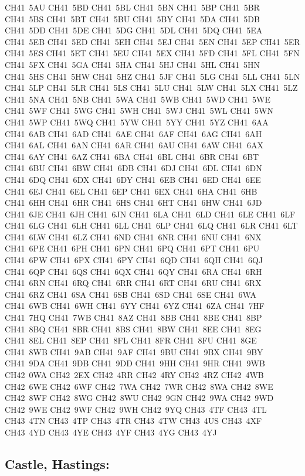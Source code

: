 \documentclass[12pt,a4paper]{article}
\begin{document}
{{CH41~5AU	CH41~5BD	CH41~5BL	CH41~5BN	CH41~5BP	CH41~5BR
CH41~5BS	CH41~5BT	CH41~5BU	CH41~5BY	CH41~5DA	CH41~5DB
CH41~5DD	CH41~5DE	CH41~5DG	CH41~5DL	CH41~5DQ	CH41~5EA
CH41~5EB	CH41~5ED	CH41~5EH	CH41~5EJ	CH41~5EN	CH41~5EP
CH41~5ER	CH41~5ES	CH41~5ET	CH41~5EU	CH41~5EX	CH41~5FD
CH41~5FL	CH41~5FN	CH41~5FX	CH41~5GA	CH41~5HA	CH41~5HJ
CH41~5HL	CH41~5HN	CH41~5HS	CH41~5HW	CH41~5HZ	CH41~5JF
CH41~5LG	CH41~5LL	CH41~5LN	CH41~5LP	CH41~5LR	CH41~5LS
CH41~5LU	CH41~5LW	CH41~5LX	CH41~5LZ	CH41~5NA	CH41~5NB
CH41~5WA	CH41~5WB	CH41~5WD	CH41~5WE	CH41~5WF	CH41~5WG
CH41~5WH	CH41~5WJ	CH41~5WL	CH41~5WN	CH41~5WP	CH41~5WQ
CH41~5YW	CH41~5YY	CH41~5YZ	CH41~6AA	CH41~6AB	CH41~6AD
CH41~6AE	CH41~6AF	CH41~6AG	CH41~6AH	CH41~6AL	CH41~6AN
CH41~6AR	CH41~6AU	CH41~6AW	CH41~6AX	CH41~6AY	CH41~6AZ
CH41~6BA	CH41~6BL	CH41~6BR	CH41~6BT	CH41~6BU	CH41~6BW
CH41~6DB	CH41~6DJ	CH41~6DL	CH41~6DN	CH41~6DQ	CH41~6DX
CH41~6DY	CH41~6EB	CH41~6ED	CH41~6EE	CH41~6EJ	CH41~6EL
CH41~6EP	CH41~6EX	CH41~6HA	CH41~6HB	CH41~6HH	CH41~6HR
CH41~6HS	CH41~6HT	CH41~6HW	CH41~6JD	CH41~6JE	CH41~6JH
CH41~6JN	CH41~6LA	CH41~6LD	CH41~6LE	CH41~6LF	CH41~6LG
CH41~6LH	CH41~6LL	CH41~6LP	CH41~6LQ	CH41~6LR	CH41~6LT
CH41~6LW	CH41~6LZ	CH41~6ND	CH41~6NR	CH41~6NU	CH41~6NX
CH41~6PE	CH41~6PH	CH41~6PN	CH41~6PQ	CH41~6PT	CH41~6PU
CH41~6PW	CH41~6PX	CH41~6PY	CH41~6QD	CH41~6QH	CH41~6QJ
CH41~6QP	CH41~6QS	CH41~6QX	CH41~6QY	CH41~6RA	CH41~6RH
CH41~6RN	CH41~6RQ	CH41~6RR	CH41~6RT	CH41~6RU	CH41~6RX
CH41~6RZ	CH41~6SA	CH41~6SB	CH41~6SD	CH41~6SE	CH41~6WA
CH41~6WB	CH41~6WH	CH41~6YY	CH41~6YZ	CH41~6ZA	CH41~7HF
CH41~7HQ	CH41~7WB	CH41~8AZ	CH41~8BB	CH41~8BE	CH41~8BP
CH41~8BQ	CH41~8BR	CH41~8BS	CH41~8BW	CH41~8EE	CH41~8EG
CH41~8EL	CH41~8EP	CH41~8FL	CH41~8FR	CH41~8FU	CH41~8GE
CH41~8WB	CH41~9AB	CH41~9AF	CH41~9BU	CH41~9BX	CH41~9BY
CH41~9DA	CH41~9DB	CH41~9DD	CH41~9HH	CH41~9HR	CH41~9WB
CH42~0WA	CH42~2EX	CH42~4RR	CH42~4RY	CH42~4RZ	CH42~4WB
CH42~6WE	CH42~6WF	CH42~7WA	CH42~7WR	CH42~8WA	CH42~8WE
CH42~8WF	CH42~8WG	CH42~8WU	CH42~9GN	CH42~9WA	CH42~9WD
CH42~9WE	CH42~9WF	CH42~9WH	CH42~9YQ	CH43~4TF	CH43~4TL
CH43~4TN	CH43~4TP	CH43~4TR	CH43~4TW	CH43~4US	CH43~4XF
CH43~4YD	CH43~4YE	CH43~4YF	CH43~4YG	CH43~4YJ	
}}

\subsection*{Castle, Hastings:}
\end{document}
